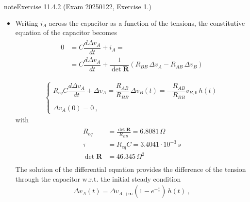 \documentclass[letterpaper,10pt,english]{jupyterBook}
\begin{document}
\begin{sphinxadmonition}{note}{Exercise 11.4.2 (Exam 2025\sphinxhyphen{}01\sphinxhyphen{}22, Exercise 1.)}
\begin{itemize}
\begin{equation*}
\end{equation*}
\item {} 
\sphinxAtStartPar
{} Writing \(i_A\) across the capacitor as a function of the tensions, the constitutive equation of the capacitor becomes
\begin{equation*}
\begin{split}\begin{aligned}
  0 & = C \dfrac{d \Delta v_A}{d t} + i_A = \\
    & = C \dfrac{d \Delta v_A}{d t} + \dfrac{1}{\det \mathbf{R}} \left( R_{BB} \, \Delta v_A - R_{AB} \, \Delta v_B \right)  \\ \\
   \end{aligned}\end{split}
\end{equation*}\begin{equation*}
\begin{split}\begin{cases}
      R_{eq} C \dfrac{d \Delta v_A}{d t} + \Delta v_A = \dfrac{ R_{AB} }{ R_{BB} } \, \Delta v_B(t) = - \dfrac{ R_{AB} }{ R_{BB} } v_{B,0} \, h(t)  \\ \\
      \Delta v_A(0) = 0 \ ,
   \end{cases}\end{split}
\end{equation*}
\sphinxAtStartPar
with
\begin{equation*}
\begin{split}\begin{aligned}
     R_{eq} & = \frac{\det \mathbf{R}}{R_{BB}} = 6.8081 \, \Omega \\
     \tau & = R_{eq} C = 3.4041 \cdot 10^{-3} \, s \\
     \det \mathbf{R} & = 46.345 \, \Omega^2 \\
   \end{aligned}\end{split}
\end{equation*}
\sphinxAtStartPar
The solution of the differential equation provides the difference of the tension through the capacitor w.r.t. the initial steady condition
\begin{equation*}
\begin{split}\Delta v_A(t) = \Delta v_{A,+\infty} \left( 1 - e^{-\frac{t}{\tau}} \right) \, h(t) \ ,\end{split}
\end{equation*}

\end{itemize}
\end{sphinxadmonition}
\end{document}
